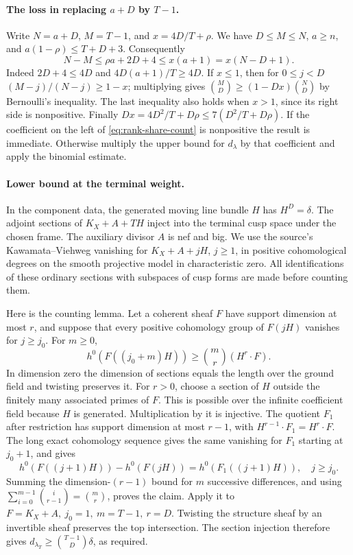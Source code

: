 \paragraph{The loss in replacing \(a+D\) by \(T-1\).}
Write \(N=a+D\), \(M=T-1\), and \(x=4D/T+\rho\).
We have \(D\le M\le N\), \(a\ge n\), and
\(a(1-\rho)\le T+D+3\). Consequently
\[
 N-M\le \rho a+2D+4\le x(a+1)=x(N-D+1).
\]
Indeed \(2D+4\le4D\) and \(4D(a+1)/T\ge4D\).
If \(x\le1\), then for \(0\le j<D\)
\((M-j)/(N-j)\ge1-x\); multiplying gives
\(\binom{M}{D}\ge(1-Dx)\binom{N}{D}\) by Bernoulli's inequality.
The last inequality also holds when \(x>1\), since its right side is
nonpositive. Finally \(Dx=4D^2/T+D\rho\le7(D^2/T+D\rho)\).
If the coefficient on the left of \eqref{eq:rank-share-count} is
nonpositive the result is immediate. Otherwise multiply the upper bound
for \(d_\lambda\) by that coefficient and apply the binomial estimate.

\paragraph{Lower bound at the terminal weight.}
In the component data, the generated moving line bundle \(H\) has
\(H^D=\delta\). The adjoint sections of
\(K_X+A+TH\) inject into the terminal cusp space under the chosen frame.
The auxiliary divisor \(A\) is nef and big. We use the source's
Kawamata--Viehweg vanishing for
\(K_X+A+jH\), \(j\ge1\), in positive cohomological degrees on the
smooth projective model in characteristic zero. All identifications of
these ordinary sections with subspaces of cusp forms are made before
counting them.

Here is the counting lemma. Let a coherent sheaf \(F\) have support
dimension at most \(r\), and suppose that every positive cohomology group
of \(F(jH)\) vanishes for \(j\ge j_0\). For \(m\ge0\),
\[
 h^0(F((j_0+m)H))\ge \binom{m}{r}(H^r\cdot F).
\]
In dimension zero the dimension of sections equals the length over the
ground field and twisting preserves it. For \(r>0\), choose a section of
\(H\) outside the finitely many associated primes of \(F\). This is
possible over the infinite coefficient field because \(H\) is generated.
Multiplication by it is injective. The quotient \(F_1\) after restriction
has support dimension at most \(r-1\), with
\(H^{r-1}\cdot F_1=H^r\cdot F\).
The long exact cohomology sequence gives the same vanishing for \(F_1\)
starting at \(j_0+1\), and gives
\[
 h^0(F((j+1)H))-h^0(F(jH))=h^0(F_1((j+1)H)),\quad j\ge j_0 .
\]
Summing the dimension-\((r-1)\) bound for \(m\) successive differences,
and using \(\sum_{i=0}^{m-1}\binom{i}{r-1}=\binom{m}{r}\), proves
the claim. Apply it to \(F=K_X+A,\ j_0=1,\ m=T-1,\ r=D\). Twisting
the structure sheaf by an invertible sheaf preserves the top intersection.
The section injection therefore gives \(d_{\lambda_T}\ge
\binom{T-1}{D}\delta\), as required.


